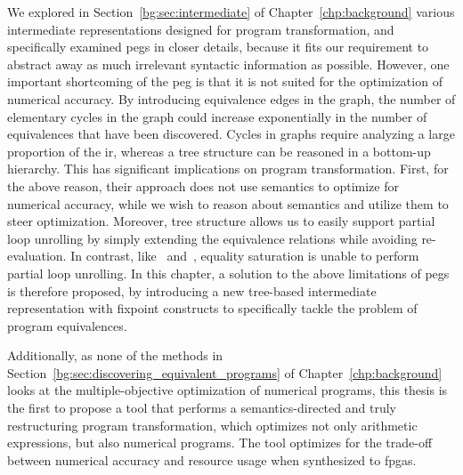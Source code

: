We explored in Section~\ref{bg:sec:intermediate} of
Chapter~\ref{chp:background} various intermediate representations designed
for program transformation, and specifically examined \glspl{peg} in closer
details, because it fits our requirement to abstract away as much irrelevant
syntactic information as possible.  However, one important shortcoming of the
\gls{peg} is that it is not suited for the optimization of numerical accuracy.
By introducing equivalence edges in the graph, the number of elementary cycles
in the graph could increase exponentially in the number of equivalences that
have been discovered.  Cycles in graphs require analyzing a large proportion
of the \gls{ir}, whereas a tree structure can be reasoned in a bottom-up
hierarchy.  This has significant implications on program transformation.
First, for the above reason, their approach does not use semantics to
optimize for numerical accuracy, while we wish to reason about semantics and
utilize them to steer optimization.  Moreover, tree structure allows us to
easily support partial loop unrolling by simply extending the equivalence
relations while avoiding re-evaluation.  In contrast, like~\cite{martel09}
and~\cite{damouche15}, equality saturation is unable to perform partial
loop unrolling.  In this chapter, a solution to the above limitations of
\glspl{peg} is therefore proposed, by introducing a new tree-based intermediate
representation with fixpoint constructs to specifically tackle the problem of
program equivalences.

Additionally, as none of the methods in
Section~\ref{bg:sec:discovering_equivalent_programs} of
Chapter~\ref{chp:background} looks at the multiple-objective optimization of
numerical programs, this thesis is the first to propose a tool that performs
a semantics-directed and truly restructuring program transformation, which
optimizes not only arithmetic expressions, but also numerical programs.  The
tool optimizes for the trade-off between numerical accuracy and resource usage
when synthesized to \glspl{fpga}.


